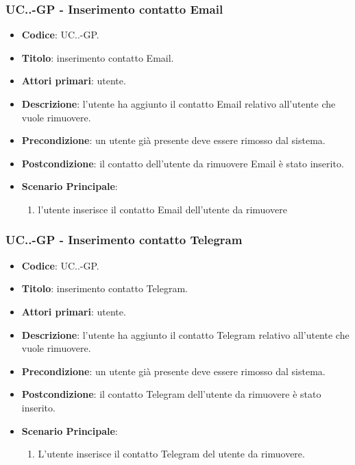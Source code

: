			\subsubsection{UC\theuccount.\thesubuccount.\thesubsubuccount-GP - Inserimento contatto Email}
				
				\begin{itemize}
					\item \textbf{Codice}: UC\theuccount.\thesubuccount.\thesubsubuccount-GP.
					\item \textbf{Titolo}: inserimento contatto Email.
					\item \textbf{Attori primari}: utente.
					\item \textbf{Descrizione}: l'utente ha aggiunto il contatto Email relativo all'utente che vuole rimuovere.
					\item \textbf{Precondizione}: un utente già presente deve essere rimosso dal sistema.
					\item \textbf{Postcondizione}: il contatto dell'utente da rimuovere Email è stato inserito.
					\item \textbf{Scenario Principale}:
					\begin{enumerate}
						\item l'utente inserisce il contatto Email dell'utente da rimuovere
					\end{enumerate}
				\end{itemize}
			
			\subsubsection{UC\theuccount.\thesubuccount.\thesubsubuccount-GP - Inserimento contatto Telegram}
				
				\begin{itemize}
					\item \textbf{Codice}: UC\theuccount.\thesubuccount.\thesubsubuccount-GP.
					\item \textbf{Titolo}: inserimento contatto Telegram.
					\item \textbf{Attori primari}: utente.
					\item \textbf{Descrizione}: l'utente ha aggiunto il contatto Telegram relativo all'utente che vuole \newline rimuovere.
					\item \textbf{Precondizione}: un utente già presente deve essere rimosso dal sistema.
					\item \textbf{Postcondizione}: il contatto Telegram dell'utente da rimuovere è stato inserito.
					\item \textbf{Scenario Principale}:
					\begin{enumerate}
						\item L'utente inserisce il contatto Telegram del utente da rimuovere.
					\end{enumerate}
				\end{itemize}
			
